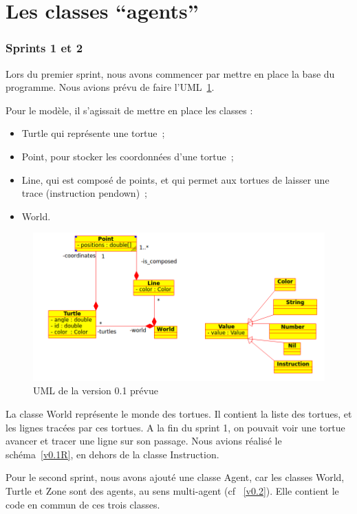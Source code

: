 \section{Les classes \enquote{agents}}
\subsubsection{Sprints 1 et 2}
Lors du premier sprint, nous avons commencer par mettre en place la base du programme. Nous avions prévu de faire l'UML~\ref{v0.1}.

 Pour le modèle, il s'agissait de mettre en place les classes :
\begin{itemize}
\item Turtle qui représente une tortue~;
\item Point, pour stocker les coordonnées d'une tortue~;
\item Line, qui est composé de points, et qui permet aux tortues de laisser une trace (instruction pendown)~;
\item World.
\end{itemize}


\begin{figure}[h]
\includegraphics[scale=0.5]{doc/report/uml/v01.png}
\caption{\label{v0.1} UML de la version 0.1 prévue}
\end{figure}


La classe World représente le monde des tortues. Il contient la liste des tortues, et les lignes tracées par ces tortues.
A la fin du sprint 1, on pouvait voir une tortue avancer et tracer une ligne sur son passage.
Nous avions réalisé le schéma~\ref{v0.1R}, en dehors de la classe Instruction.

Pour le second sprint, nous avons ajouté une classe Agent, car les classes World, Turtle et Zone sont des agents, au sens multi-agent (cf ~\ref{v0.2}). Elle contient le code en commun de ces trois classes.

